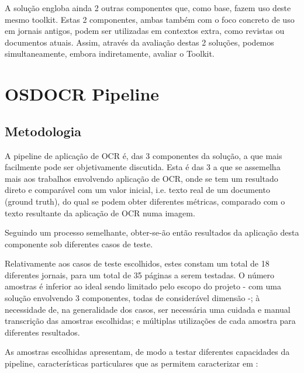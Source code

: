 A solução engloba ainda 2 outras componentes que, como base, fazem uso deste mesmo toolkit. Estas 2 componentes, ambas também com o foco concreto de uso em jornais antigos, podem ser utilizadas em contextos extra, como revistas ou documentos atuais. Assim, através da avaliação destas 2 soluções, podemos simultaneamente, embora indiretamente, avaliar o Toolkit.



\section{OSDOCR Pipeline}


\subsection{Metodologia}


A pipeline de aplicação de OCR é, das 3 componentes da solução, a que mais facilmente pode ser objetivamente discutida. Esta é das 3 a que se assemelha mais aos trabalhos envolvendo aplicação de OCR, onde se tem um resultado direto e comparável com um valor inicial, i.e. texto real de um documento (ground truth), do qual se podem obter diferentes métricas, comparado com o texto resultante da aplicação de OCR numa imagem.

Seguindo um processo semelhante, obter-se-ão então resultados da aplicação desta componente sob diferentes casos de teste. 

Relativamente aos casos de teste escolhidos, estes constam um total de 18 diferentes jornais, para um total de 35 páginas a serem testadas. O número amostras é inferior ao ideal sendo limitado pelo escopo do projeto - com uma solução envolvendo 3 componentes, todas de considerável dimensão -; à necessidade de, na generalidade dos casos, ser necessária uma cuidada e manual transcrição das amostras escolhidas; e múltiplas utilizações de cada amostra para diferentes resultados.

As amostras escolhidas apresentam, de modo a testar diferentes capacidades da pipeline, características particulares que as permitem caracterizar em :

